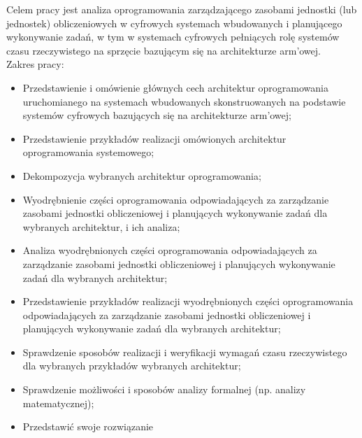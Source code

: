 \documentclass[../../main]{subfiles}
\begin{document}
Celem pracy jest analiza oprogramowania zarządzającego zasobami jednostki (lub jednostek)
obliczeniowych w cyfrowych systemach wbudowanych i planującego wykonywanie zadań, w tym w systemach
cyfrowych pełniących rolę systemów czasu rzeczywistego na sprzęcie bazującym się na architekturze
\acrshort{arm}'owej.\\
Zakres pracy:
\begin{itemize}
    \item Przedstawienie i omówienie głównych cech architektur oprogramowania uruchomianego na systemach wbudowanych skonstruowanych na podstawie systemów cyfrowych bazujących się na architekturze \acrshort{arm}'owej;
    \item Przedstawienie przykładów realizacji omówionych architektur oprogramowania systemowego;
    \item Dekompozycja wybranych architektur oprogramowania;
    \item Wyodrębnienie części oprogramowania odpowiadających za zarządzanie zasobami jednostki obliczeniowej i planujących wykonywanie zadań dla wybranych architektur, i ich analiza;
    \item Analiza wyodrębnionych części oprogramowania odpowiadających za zarządzanie zasobami jednostki obliczeniowej i planujących wykonywanie zadań dla wybranych architektur;
    \item Przedstawienie przykładów realizacji wyodrębnionych części oprogramowania odpowiadających za zarządzanie zasobami jednostki obliczeniowej i planujących wykonywanie zadań dla wybranych architektur;
    \item Sprawdzenie sposobów realizacji i weryfikacji wymagań czasu rzeczywistego dla wybranych przykładów wybranych architektur;
    \item Sprawdzenie możliwości i sposobów analizy formalnej (np. analizy matematycznej);
    \item Przedstawić swoje rozwiązanie %
\end{itemize}
\end{document}
